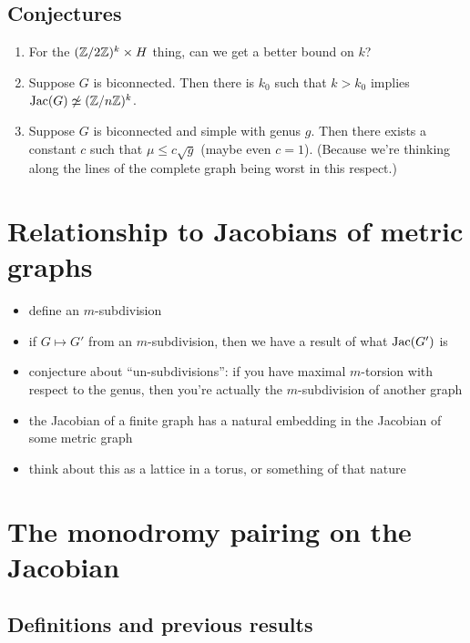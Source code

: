 \documentclass{amsart}
\begin{document}
\subsection{Conjectures}

\begin{enumerate}
\item For the $(\mathbb{Z}/2\mathbb{Z})^k\times H$ thing, can we get a better bound on
$k$?

\item Suppose $G$ is biconnected. Then there is $k_0$ such that
$k>k_0$ implies $\operatorname{Jac}(G)\not\simeq(\mathbb{Z}/n\mathbb{Z})^k$.

\item Suppose $G$ is biconnected and simple with genus $g$. Then there
exists a constant $c$ such that $\mu\le c\sqrt{g}$ (maybe even
$c=1$). (Because we're thinking along the lines of the complete graph
being worst in this respect.)
\end{enumerate}

\section{Relationship to Jacobians of metric graphs}

\begin{itemize}

\item define an $m$-subdivision

\item if $G\mapsto G'$ from an $m$-subdivision, then we have a result
of what $\operatorname{Jac}(G')$ is

\item conjecture about ``un-subdivisions'': if you have maximal
$m$-torsion with respect to the genus, then you're actually the
$m$-subdivision of another graph

\item the Jacobian of a finite graph has a natural embedding in the
Jacobian of some metric graph

\item think about this as a lattice in a torus, or something of that
nature
\end{itemize}

\section{The monodromy pairing on the Jacobian}

\subsection{Definitions and previous results}
\end{document}
